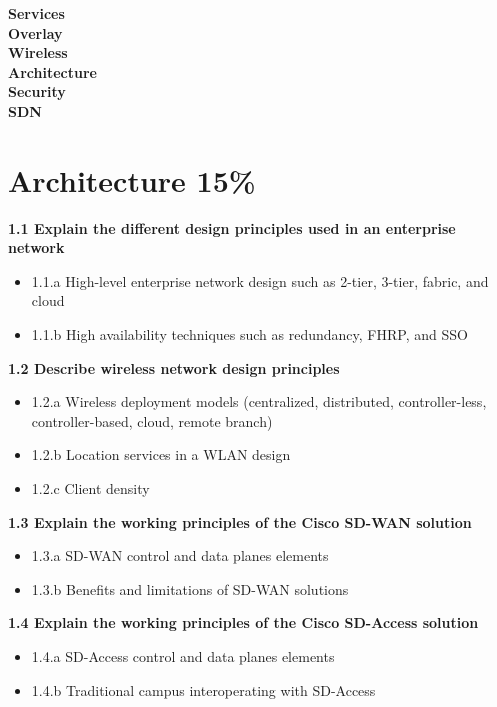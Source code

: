 \documentclass{article}
\begin{document}
\newpage
\noindent\textbf{Services}\\

\newpage
\noindent\textbf{Overlay}\\

\newpage
\noindent\textbf{Wireless}\\

\newpage
\noindent\textbf{Architecture}\\

\newpage
\noindent\textbf{Security}\\

\newpage
\noindent\textbf{SDN}\\

\newpage
\section{Architecture 15\%}
\textbf{1.1 Explain the different design principles used in an enterprise network}
\begin{itemize}
\item 1.1.a High-level enterprise network design such as 2-tier, 3-tier, fabric, and cloud
\item 1.1.b High availability techniques such as redundancy, FHRP, and SSO
\end{itemize}

\noindent\textbf{1.2 Describe wireless network design principles}
\begin{itemize}
\item 1.2.a Wireless deployment models (centralized, distributed, controller-less, controller-based, cloud, remote branch)
\item 1.2.b Location services in a WLAN design
\item 1.2.c Client density
\end{itemize}

\noindent\textbf{1.3 Explain the working principles of the Cisco SD-WAN solution}
\begin{itemize}
\item 1.3.a SD-WAN control and data planes elements
\item 1.3.b Benefits and limitations of SD-WAN solutions
\end{itemize}

\noindent\textbf{1.4 Explain the working principles of the Cisco SD-Access solution}
\begin{itemize}
\item 1.4.a SD-Access control and data planes elements
\item 1.4.b Traditional campus interoperating with SD-Access
\end{itemize}
\end{document}
